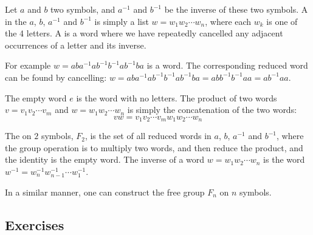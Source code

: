 \begin{example}
  Let $a$ and $b$ two symbols, and $a^{-1}$ and $b^{-1}$ be the inverse
  of these two symbols.  A  in the 
  $a$, $b$, $a^{-1}$ and $b^{-1}$
  is simply a list $w = w_{1}w_{2}\cdots w_{n}$, where each $w_{k}$ is one
  of the 4 letters.  A  is a word where
  we have repeatedly cancelled any adjacent occurrences of a letter and its
  inverse.
  
  For example $w = aba^{-1}ab^{-1}b^{-1}ab^{-1}ba$ is a word.  The corresponding
  reduced word can be found by cancelling: $w = aba^{-1}ab^{-1}b^{-1}ab^{-1}ba =
  abb^{-1}b^{-1}aa = ab^{-1}aa$.
  
  The empty word $e$ is the word with no letters.  The product of two words
  $v = v_{1}v_{2}\cdots v_{m}$ and $w = w_{1}w_{2}\cdots w_{n}$ is simply
  the concatenation of the two words:
  \[
    vw = v_{1}v_{2}\cdots v_{m}w_{1}w_{2}\cdots w_{n}
  \]
  
  The  on $2$ symbols, $F_{2}$, is the set of
  all reduced words in $a$, $b$, $a^{-1}$ and
  $b^{-1}$, where the group operation is to multiply two words, and then reduce
  the product, and the identity is the empty word.  The inverse of a word
  $w = w_{1}w_{2}\cdots w_{n}$ is the word $w^{-1} = w_{n}^{-1}w_{n-1}^{-1}\cdots
  w_{1}^{-1}$.
  
  In a similar manner, one can construct the free group $F_{n}$ on $n$ symbols.
\end{example}

\subsection*{Exercises}

